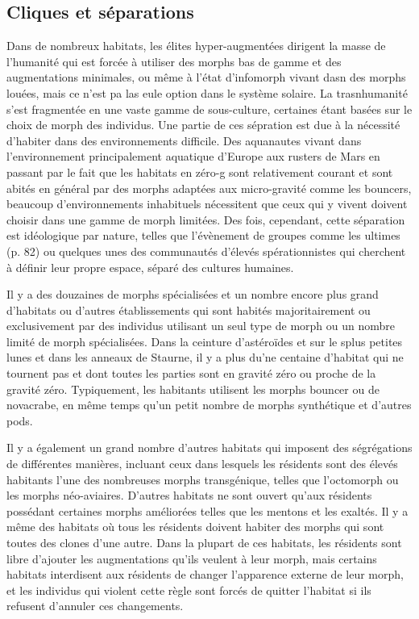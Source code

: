\subsection{Cliques et séparations} \label{sec:clades-separation} 

Dans de nombreux habitats, les élites hyper-augmentées dirigent la masse de l'humanité qui est forcée à utiliser des morphs bas de gamme et des augmentations minimales, ou même à l'état d'infomorph vivant dasn des morphs louées, mais ce n'est pa las eule option dans le système solaire. La trasnhumanité s'est fragmentée en une vaste gamme de sous-culture, certaines étant basées sur le choix de morph des individus. Une partie de ces sépration est due à la nécessité d'habiter dans des environnements difficile. Des aquanautes vivant dans l'environnement principalement aquatique d'Europe aux rusters de Mars en passant par le fait que les habitats en zéro-g sont relativement courant et sont abités en général par des morphs adaptées aux micro-gravité comme les bouncers, beaucoup d'environnements inhabituels nécessitent que ceux qui y vivent doivent choisir dans une gamme de morph limitées. Des fois, cependant, cette séparation est idéologique par nature, telles que l'évènement de groupes comme les ultimes (p. 82) ou quelques unes des communautés d'élevés spérationnistes qui cherchent à définir leur propre espace, séparé des cultures humaines. 

Il y a des douzaines de morphs spécialisées et un nombre encore plus grand d'habitats ou d'autres établissements qui sont habités majoritairement ou exclusivement par des individus utilisant un seul type de morph ou un nombre limité de morph spécialisées. Dans la ceinture d'astéroïdes et sur le splus petites lunes et dans les anneaux de Staurne, il y a plus du'ne centaine d'habitat qui ne tournent pas et dont toutes les parties sont en gravité zéro ou proche de la gravité zéro. Typiquement, les habitants utilisent les morphs bouncer ou de novacrabe, en même temps qu'un petit nombre de morphs synthétique et d'autres pods. 

Il y a également un grand nombre d'autres habitats qui imposent des ségrégations de différentes manières, incluant ceux dans lesquels les résidents sont des élevés habitants l'une des nombreuses morphs transgénique, telles que l'octomorph ou les morphs néo-aviaires. D'autres habitats ne sont ouvert qu'aux résidents possédant certaines morphs améliorées telles que les mentons et les exaltés. Il y a même des habitats où tous les résidents doivent habiter des morphs qui sont toutes des clones d'une autre. Dans la plupart de ces habitats, les résidents sont libre d'ajouter les augmentations qu'ils veulent à leur morph, mais certains habitats interdisent aux résidents de changer l'apparence externe de leur morph, et les individus qui violent cette règle sont forcés de quitter l'habitat si ils refusent d'annuler ces changements. 

